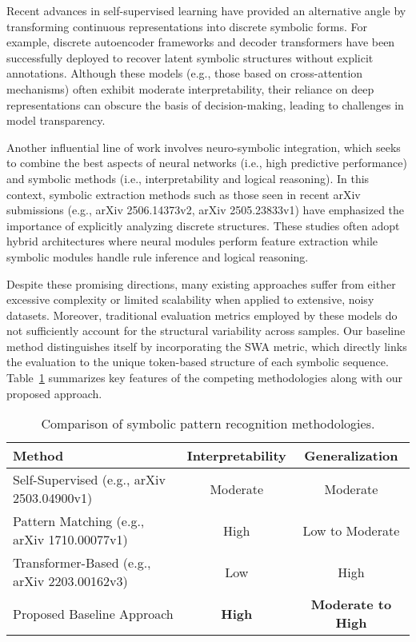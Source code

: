 \documentclass{article}
\begin{document}
Recent advances in self-supervised learning have provided an alternative angle by transforming continuous representations into discrete symbolic forms. For example, discrete autoencoder frameworks and decoder transformers have been successfully deployed to recover latent symbolic structures without explicit annotations. Although these models (e.g., those based on cross-attention mechanisms) often exhibit moderate interpretability, their reliance on deep representations can obscure the basis of decision-making, leading to challenges in model transparency.

Another influential line of work involves neuro-symbolic integration, which seeks to combine the best aspects of neural networks (i.e., high predictive performance) and symbolic methods (i.e., interpretability and logical reasoning). In this context, symbolic extraction methods such as those seen in recent arXiv submissions (e.g., arXiv 2506.14373v2, arXiv 2505.23833v1) have emphasized the importance of explicitly analyzing discrete structures. These studies often adopt hybrid architectures where neural modules perform feature extraction while symbolic modules handle rule inference and logical reasoning.

Despite these promising directions, many existing approaches suffer from either excessive complexity or limited scalability when applied to extensive, noisy datasets. Moreover, traditional evaluation metrics employed by these models do not sufficiently account for the structural variability across samples. Our baseline method distinguishes itself by incorporating the SWA metric, which directly links the evaluation to the unique token-based structure of each symbolic sequence. Table~\ref{tab:related} summarizes key features of the competing methodologies along with our proposed approach.

\begin{table}[h]
\centering
\begin{tabular}{|l|c|c|}
\hline
\textbf{Method} & \textbf{Interpretability} & \textbf{Generalization} \\
\hline
Self-Supervised (e.g., arXiv 2503.04900v1) & Moderate & Moderate \\
Pattern Matching (e.g., arXiv 1710.00077v1) & High & Low to Moderate \\
Transformer-Based (e.g., arXiv 2203.00162v3) & Low & High \\
Proposed Baseline Approach & \textbf{High} & \textbf{Moderate to High} \\
\hline
\end{tabular}
\caption{Comparison of symbolic pattern recognition methodologies.}
\label{tab:related}
\end{table}
\end{document}
